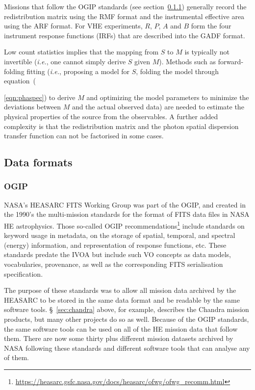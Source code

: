 \documentclass[11pt,a4paper]{ivoa}
\begin{document}
Missions that follow the OGIP standards (see section~\ref{sec:ogip}) generally record the redistribution matrix using the
\gls{RMF} format and the instrumental effective area using the \gls{ARF} format. For \gls{VHE} experiments, $R$, $P$, $A$ and
$B$ form the four instrument response functions (IRFs) that are described into the \gls{GADF} format.

Low count statistics implies that the mapping from $S$ to $M$ is typically not invertible ({\em i.e.\/}, one cannot
simply derive $S$ given $M$)\null.  Methods such as forward-folding fitting \citep{mattox:1996} ({\em i.e.\/}, proposing
a model for $S$, folding the model through equation~({\ref{eqn:phaspec}) to derive $M$ and optimizing the model parameters
to minimize the deviations between $M$ and the actual observed data) are needed to estimate the physical properties of
the source from the observables. A further added complexity is that the redistribution matrix and the photon spatial
dispersion transfer function can not be factorised in some cases.

\subsection{Data formats}
\label{sec:data_formats}

\subsubsection{OGIP}\label{sec:ogip}

\gls{NASA}'s \gls{HEASARC} \gls{FITS} Working Group was part of the \gls{OGIP}, and created in the 1990's the multi-mission standards for the format of \gls{FITS} data files in \gls{NASA} \gls{HE} astrophysics. Those so-called \gls{OGIP} recommendations\footnote{\url{https://heasarc.gsfc.nasa.gov/docs/heasarc/ofwg/ofwg_recomm.html}} include standards on keyword usage in metadata, on the storage of spatial, temporal, and spectral (energy) information, and representation of response functions, etc.  These standards predate the \gls{IVOA} but include such \gls{VO} concepts as data models, vocabularies, provenance, as well as the corresponding \gls{FITS} serialisation specification.

The purpose of these standards was to allow all mission data archived by the \gls{HEASARC} to be stored in the same data format
and be readable by the same software tools. \S~\ref{sec:chandra} above, for example, describes the Chandra mission products,
but many other projects do so as well. Because of the \gls{OGIP} standards, the same software tools can be used on all of the \gls{HE}
mission data that follow them. There are now some thirty plus different mission datasets archived by \gls{NASA} following
these standards and different software tools that can analyse any of them.

}
\end{document}
